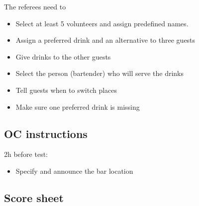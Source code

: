 The referees need to
\begin{itemize}
	\item Select at least 5 volunteers and assign predefined names.
	\item Assign a preferred drink and an alternative to three guests
	\item Give drinks to the other guests
	\item Select the person (bartender) who will serve the drinks
	\item Tell guests when to switch places
	\item Make sure one preferred drink is missing
\end{itemize}

\subsection{OC instructions}

2h before test:
\begin{itemize}
	\item Specify and announce the bar location
\end{itemize}

\subsection{Score sheet}

